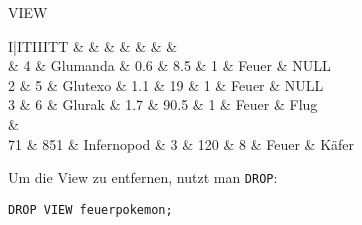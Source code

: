 \begin{sql}{VIEW}
    \begin{tabular}{I|ITIIITT}
                                   &     &  &  &  &  &  &  \\                          & 4                         & Glumanda                 & 0.6                         & 8.5                         & 1                              & Feuer                          & NULL                             \\
        2                          & 5                         & Glutexo                  & 1.1                         & 19                          & 1                              & Feuer                          & NULL                             \\
        3                          & 6                         & Glurak                   & 1.7                         & 90.5                        & 1                              & Feuer                          & Flug                             \\
         &                                                                                                                                                                                              \\
        71                         & 851                       & Infernopod               & 3                           & 120                         & 8                              & Feuer                          & Käfer                            \\
    \end{tabular}
    \vspace{1em}

    Um die View zu entfernen, nutzt man \texttt{DROP}:

    \begin{lstlisting}[language=mysql]
        DROP VIEW feuerpokemon;
    \end{lstlisting}
\end{sql}